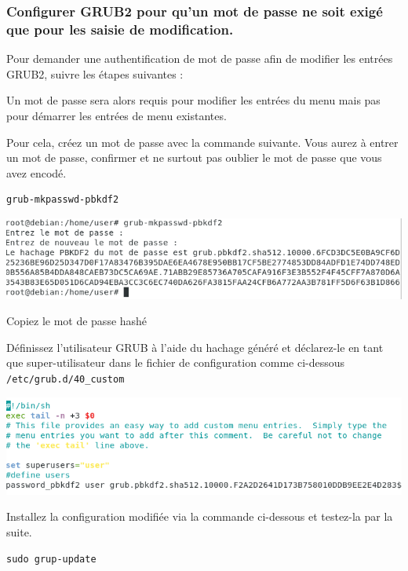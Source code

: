 \documentclass[12pt,a4paper]{article}
\newcommand{\code}[1]{\colorbox{light-gray}{\texttt{#1}}}
\begin{document}
        \subsubsection{Configurer GRUB2 pour qu'un mot de passe ne soit exigé que pour les saisie de modification.} 
        \begin{flushleft}
            \noindent Pour demander une authentification de mot de passe afin de modifier les entrées GRUB2, suivre les étapes suivantes :
            \item Un mot de passe sera alors requis pour modifier les entrées du menu mais pas pour démarrer les entrées de menu existantes. 
            \item Pour cela, créez un mot de passe avec la commande suivante. Vous aurez à entrer un mot de passe, confirmer et ne surtout pas oublier le mot de passe que vous avez encodé.
       \begin{lstlisting}
grub-mkpasswd-pbkdf2
       \end{lstlisting}
       \begin{center}
           \includegraphics[scale=0.6]{grub password}
       \end{center}
            \item Copiez le mot de passe hashé
            \item Définissez l’utilisateur GRUB à l’aide du hachage généré et déclarez-le en tant que super-utilisateur dans le fichier de configuration comme ci-dessous \code{/etc/grub.d/40\_custom}
            \begin{center}
                \includegraphics[scale=0.6]{grub password fichier modifiÃ©}
            \end{center}
            \item Installez la configuration modifiée via la commande ci-dessous et testez-la par la suite.
            \begin{lstlisting}
sudo grup-update
            \end{lstlisting}


        \end{flushleft}
\end{document}
